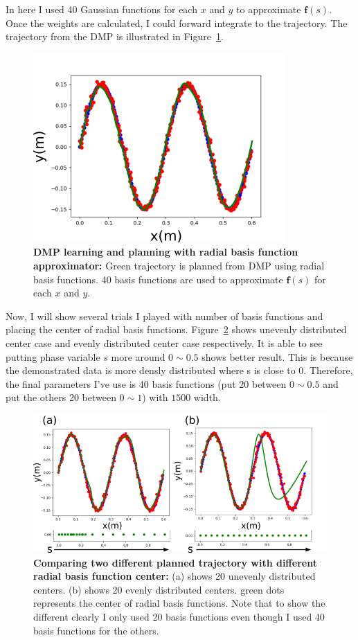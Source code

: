 \documentclass[11pt]{article}
\begin{document}
In here I used 40 Gaussian functions for each $x$ and $y$ to approximate $\mathbf{f}(s)$.
Once the weights are calculated, I could forward integrate to the trajectory.
The trajectory from the DMP is illustrated in Figure~\ref{fig:figures/rbf}.
\begin{figure}[htpb]
    \centering
    \includegraphics[width=0.5\linewidth]{figures/rbf}
    \caption{ \textbf{DMP learning and planning with radial basis function
    approximator: } Green trajectory is planned from DMP using radial basis
    functions. 40 basis functions are used to approximate $\mathbf{f}(s)$ for
    each $x$ and $y$.}
    \label{fig:figures/rbf}
\end{figure}

Now, I will show several trials I played with number of basis functions and
placing the center of radial basis functions.
Figure~\ref{fig:figures/different_s} shows unevenly distributed center case and
evenly distributed center case respectively.  It is able to see putting phase
variable $s$ more around $0 \sim 0.5$ shows better result. This is because the
demonstrated data is more densly distributed where s is close to 0.  Therefore, the
final parameters I've use is 40 basis functions (put 20 between $0\sim0.5$ and
put the others 20 between $0\sim1$) with $1500$ width.
\begin{figure}[htpb]
    \centering
    \includegraphics[width=0.7\linewidth]{figures/different_s.png}
    \caption{ \textbf{Comparing two different planned trajectory with
    different radial basis function center: } (a) shows 20 unevenly distributed
    centers. (b) shows 20 evenly distributed centers. green dots represents the center
    of radial basis functions. Note that to show the different clearly I only
    used 20 basis functions even though I used 40 basis functions for the others.}
    \label{fig:figures/different_s}
\end{figure}
\end{document}
